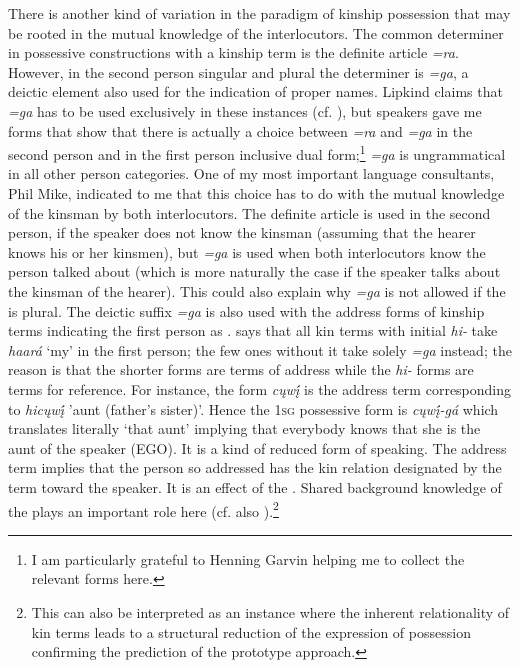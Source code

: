 \documentclass[output=paper]{LSP/langsci}
\begin{document}
There is another kind of variation in the paradigm of kinship possession that may be rooted in the mutual knowledge of the interlocutors. The common determiner in possessive constructions with a kinship term is the definite article \textit{=ra}. However, in the second person singular and plural the determiner is \textit{=ga}, a deictic element also used for the indication of proper names. Lipkind claims that \textit{=ga} has to be used exclusively in these instances (cf. \citealt[31]{Lipkind1945}), but  speakers gave me forms that show that there is actually a choice between \textit{=ra} and \textit{=ga} in the second person and in the first person inclusive dual form;\footnote{I am particularly grateful to Henning Garvin helping me to collect the relevant forms here.} \textit{=ga} is ungrammatical in all other person categories. One of my most important language consultants, Phil Mike, indicated to me that this choice has to do with the mutual knowledge of the kinsman by both interlocutors. The definite article is used in the second person, if the speaker does not know the kinsman (assuming that the hearer knows his or her kinsmen), but \textit{=ga} is used when both interlocutors know the person talked about (which is more naturally the case if the speaker talks about the kinsman of the hearer). This could also explain why \textit{=ga} is not allowed if the  is plural. The deictic suffix \textit{=ga} is also used with the address forms of kinship terms indicating the first person as . \citet[31]{Lipkind1945} says that all kin terms with initial \textit{hi-} take \textit{haará} `my' in the first person; the few ones without it take solely \textit{=ga} instead; the reason is that the shorter forms are terms of address while the \textit{hi-} forms are terms for reference. For instance, the form \textit{cųwį́} is the address term corresponding to \textit{hicųwį́} 'aunt (father's sister)'. Hence the \textsc{1sg} possessive form is \textit{cųwį́-gá} which translates literally `that aunt' implying that everybody knows that she is the aunt of the speaker (EGO). It is a kind of reduced form of speaking. The address term implies that the person so addressed has the kin relation designated by the term toward the speaker. It is an effect of the . Shared background knowledge of the  plays an important role here (cf. also \citealt[26f]{Heine1997}).\footnote{This can also be interpreted as an instance where the inherent relationality of kin terms leads to a structural reduction of the expression of possession confirming the prediction of the prototype approach.}
\end{document}
